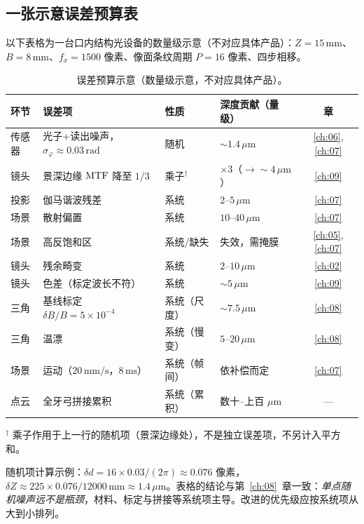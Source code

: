 \subsection{一张示意误差预算表}

以下表格为一台口内结构光设备的数量级示意（不对应具体产品）：$Z=15\,\mathrm{mm}$、$B=8\,\mathrm{mm}$、$f_x=1500$ 像素、像面条纹周期 $P=16$ 像素、四步相移。

\begin{table}[htbp]
  \centering
  \small\setlength{\tabcolsep}{4pt}
  \begin{tabular}{@{}llllc@{}}
    \toprule
    环节 & 误差项 & 性质 & 深度贡献（量级） & 章 \\
    \midrule
    传感器 & 光子+读出噪声，$\sigma_\varphi\approx0.03\,\mathrm{rad}$ & 随机 & $\sim1.4\,\mu\mathrm{m}$ & \ref{ch:06}, \ref{ch:07} \\
    镜头 & 景深边缘 $\mathrm{MTF}$ 降至 $1/3$ & 乘子$^{\dagger}$ & $\times3$（$\to\sim4\,\mu\mathrm{m}$）  & \ref{ch:09} \\
    投影 & 伽马谐波残差 & 系统 & $2$--$5\,\mu\mathrm{m}$ & \ref{ch:07} \\
    场景 & 散射偏置 & 系统 & $10$--$40\,\mu\mathrm{m}$ & \ref{ch:07} \\
    场景 & 高反饱和区 & 系统/缺失 & 失效，需掩膜 & \ref{ch:05}, \ref{ch:07} \\
    镜头 & 残余畸变 & 系统 & $2$--$10\,\mu\mathrm{m}$ & \ref{ch:02} \\
    镜头 & 色差（标定波长不符） & 系统 & $\sim5\,\mu\mathrm{m}$ & \ref{ch:09} \\
    三角 & 基线标定 $\delta B/B=5\times10^{-4}$ & 系统（尺度） & $\sim7.5\,\mu\mathrm{m}$ & \ref{ch:08} \\
    三角 & 温漂 & 系统（慢变） & $5$--$20\,\mu\mathrm{m}$ & \ref{ch:08} \\
    场景 & 运动（$20\,\mathrm{mm/s}$，$8\,\mathrm{ms}$） & 系统（帧间） & 依补偿而定 & \ref{ch:07} \\
    点云 & 全牙弓拼接累积 & 系统（累积） & 数十--上百 $\mu\mathrm{m}$ & — \\
    \bottomrule
  \end{tabular}
  \par\smallskip\footnotesize $^{\dagger}$ 乘子作用于上一行的随机项（景深边缘处），不是独立误差项，不另计入平方和。
  \caption{误差预算示意（数量级示意，不对应具体产品）。}
  \label{tab:ch11-budget}
\end{table}

随机项计算示例：$\delta d=16\times0.03/(2\pi)\approx0.076$ 像素，$\delta Z\approx225\times0.076/12000\,\mathrm{mm}\approx1.4\,\mu\mathrm{m}$。表格的结论与第~\ref{ch:08}~章一致：\emph{单点随机噪声远不是瓶颈}，材料、标定与拼接等系统项主导。改进的优先级应按系统项从大到小排列。

